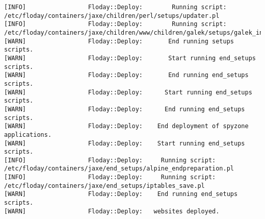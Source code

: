\begin{lstlisting}[float=t, caption={Sortie d'une exécution de \emph{Floday}}, label=fig_1.4_floday, basicstyle=\tiny, xleftmargin=-3cm]
[INFO]                 Floday::Deploy:        Running script: /etc/floday/containers/jaxe/children/perl/setups/updater.pl
[INFO]                 Floday::Deploy:        Running script: /etc/floday/containers/jaxe/children/www/children/galek/setups/galek_install.pl
[WARN]                 Floday::Deploy:       End running setups scripts.
[WARN]                 Floday::Deploy:       Start running end_setups scripts.
[WARN]                 Floday::Deploy:       End running end_setups scripts.
[WARN]                 Floday::Deploy:      Start running end_setups scripts.
[WARN]                 Floday::Deploy:      End running end_setups scripts.
[WARN]                 Floday::Deploy:    End deployment of spyzone applications.
[WARN]                 Floday::Deploy:    Start running end_setups scripts.
[INFO]                 Floday::Deploy:     Running script: /etc/floday/containers/jaxe/end_setups/alpine_endpreparation.pl
[INFO]                 Floday::Deploy:     Running script: /etc/floday/containers/jaxe/end_setups/iptables_save.pl
[WARN]                 Floday::Deploy:    End running end_setups scripts.
[WARN]                 Floday::Deploy:   websites deployed.
\end{lstlisting}
